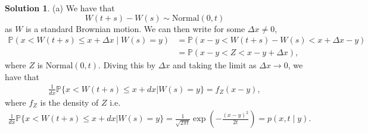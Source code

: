\documentclass[12pt]{article}
\newcommand{\Prob}{\mathbb{P}}
\theoremstyle{definition}
\newtheorem{sol}{Solution}
\theoremstyle{remark}
\begin{document}
\begin{sol}
    (a) We have that 
    \begin{equation*}
        W(t + s) - W(s) \sim \text{Normal}(0, t)
    \end{equation*}
    as $W$ is a standard Brownian motion. We can then write for some $\Delta x \neq 0$,
    \begin{align*}
        \Prob( x < W(t + s) \leq x + \Delta x  \mid W(s) = y) &= \Prob(x - y < W(t + s) - W(s) < x + \Delta x - y )\\
                                                        &= \Prob(x - y < Z < x - y + \Delta x),
    \end{align*}
    where $Z$ is $\text{Normal}(0,t)$. Diving this by $\Delta x$ and taking the limit as $\Delta x \to 0$, we have that
    \begin{align*}
        \frac{1}{d x}\Prob\Big\{ x< W(t+s)\le x+ d x \Big| W(s)=y\Big\} = f_{Z}(x - y), 
    \end{align*}
    where $f_{Z}$ is the density of $Z$ i.e.
    \begin{align*}
        \frac{1}{d x}\Prob\Big\{ x< W(t+s)\le x+ d x \Big| W(s)=y\Big\} = \frac{1}{\sqrt{2\pi t}}\exp\left( -\frac{(x-y)^{2}}{2t} \right) = p(x,t \mid y).
    \end{align*}


\end{sol}
\end{document}
